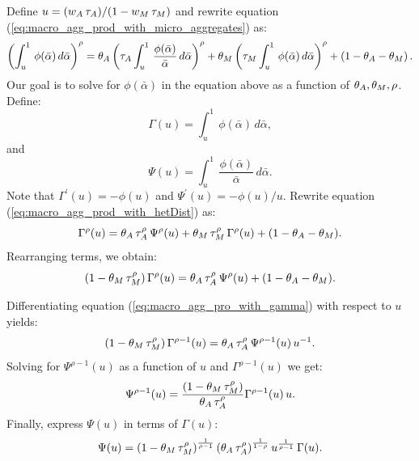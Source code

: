 Define $u=({w_{A}\,\tau_{A}})/(1-w_{M}\,\tau_{M})$ and rewrite equation (\ref{eq:macro_agg_prod_with_micro_aggregates}) as:
\begin{equation}
\left(\int_{u}^{1}\,\phi(\bar{\alpha})\,d\bar{\alpha}\right)^{\rho}
=
\theta_{A}\left(\tau_{A}\int_{u}^{1}\,\frac{\phi(\bar{\alpha})}{\bar{\alpha}}\,d\bar{\alpha}\right)^{\rho}
+
\theta_{M} \left(\tau_{M}\int_{u}^{1}\,\phi(\bar{\alpha})\,d\bar{\alpha}\right)^{\rho}
+
\left(1-\theta_{A}-\theta_{M}\right).
\label{eq:macro_agg_prod_with_hetDist}
\end{equation}
Our goal is to solve for $\phi(\bar{\alpha})$ in the equation above as a function of $\theta_{A},\theta_{M},\rho$.
Define:
\begin{equation}
\Gamma(u)=\int_{u}^{1}\,\phi(\bar{\alpha})\,d\bar{\alpha},\label{eq:gamma}
\end{equation}
and
\begin{equation}
\Psi(u)=\int_{u}^{1}\,\frac{\phi(\bar{\alpha})}{\bar{\alpha}}\,d\bar{\alpha}.\label{eq:psi}
\end{equation}
Note that $\Gamma^{'}(u)=-\phi(u)$ and $\Psi^{'}(u)=-\phi(u)/u$.
Rewrite equation (\ref{eq:macro_agg_prod_with_hetDist}) as:
\[
\Gamma^{\rho}(u)=\theta_{A}\,\tau_{A}^{\rho}\,\Psi^{\rho}(u)+\theta_{M}\,\tau_{M}^{\rho}\,\Gamma^{\rho}(u)+(1-\theta_{A}-\theta_{M}).
\]
Rearranging terms, we obtain:
\begin{equation}
\left(1-\theta_{M}\,\tau_{M}^{\rho}\right)\Gamma^{\rho}(u)=\theta_{A}\,\tau_{A}^{\rho}\,\Psi^{\rho}(u)+(1-\theta_{A}-\theta_{M}).\label{eq:macro_agg_pro_with_gamma}
\end{equation}

Differentiating equation (\ref{eq:macro_agg_pro_with_gamma}) with respect to $u$ yields:
\[
\left(1-\theta_{M}\,\tau_{M}^{\rho}\right)\Gamma^{\rho-1}(u)=\theta_{A}\,\tau_{A}^{\rho}\,\Psi^{\rho-1}(u)\,u^{-1}.
\]
Solving for $\Psi^{\rho-1}(u)$ as a function of $u$ and $\Gamma^{\rho-1}(u)$ we get:
\[
\Psi^{\rho-1}(u)=\frac{\left(1-\theta_{M}\,\tau_{M}^{\rho}\right)}{\theta_{A}\,\tau_{A}^{\rho}}\Gamma^{\rho-1}(u)\,u.
\]
Finally, express $\Psi(u)$ in terms of $\Gamma(u)$:
\begin{equation}
\Psi(u)=\left(1-\theta_{M}\,\tau_{M}^{\rho}\right)^{\frac{1}{\rho-1}}\left(\theta_{A}\,\tau_{A}^{\rho}\right)^{\frac{1}{1-\rho}}u^{\frac{1}{\rho-1}}\,\Gamma(u).\label{eq:psi_solved}
\end{equation}



